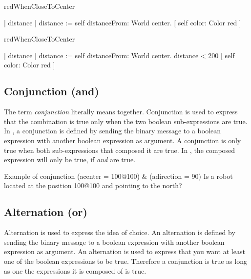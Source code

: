 \begin{minipage}[t]{8cm}
\begin{method}\label{mth:redWhenCloseToCenter33}
redWhenCloseToCenter

   | distance | 
   distance := self distanceFrom: World  center.
       [ self color: Color red ]
\end{method}
\end{minipage}
\begin{minipage}[t]{8cm}
\begin{method}\label{mth:redWhenCloseToCenter23}
redWhenCloseToCenter

   | distance | 
   distance := self distanceFrom: World  center.
   distance < 200
       [ self color: Color red ]
\end{method}
\end{minipage}



\subsection*{Conjunction (and)}
 The term \textit{conjunction} literally means together. Conjunction is used to express that the combination is true only when the two boolean sub-expressions are true. In \sq, a conjunction is defined by sending the binary message \index{\&}\ct{\&} to a boolean expression with another boolean expression as argument. 
A conjunction is only true when both sub-expressions that composed it are true.  In , the composed expression will only be true, if  \textit{and}  are true. 

\begin{scriptwithtitle}{Example of conjunction}\label{scr:conjunction}
(a\Turtle center = 100@100) & (a\Turtle direction = 90)
\textrm{Is a robot located at the position 100@100 and pointing to the north?}
\end{scriptwithtitle}


\subsection*{Alternation (or)} 
Alternation is used to express the idea of choice. An alternation is defined by sending the binary message \index{$\mid$}\ct{$\mid$} to a boolean expression with another boolean expression as argument. An alternation is used to express that you want at least one of the  boolean expressions to be true. Therefore a conjunction is true as long as one the expressions it is composed of is true.  

